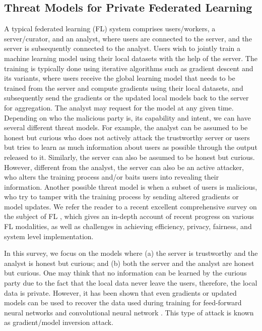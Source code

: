 
\subsection{Threat Models for Private Federated Learning}
A typical federated learning (FL) system  \cite{pmlr-v54-mcmahan17a, AdvancesFLNOW2021} comprises users/workers, a server/curator, and an analyst, where users are connected to the server, and the server is subsequently connected to the analyst. Users wish to jointly train a machine learning model using their local datasets with the help of the server. The training is typically done using iterative algorithms such as gradient descent and its variants, where users receive the global learning model that needs to be trained from the server and compute gradients using their local datasets, and subsequently send the gradients or the updated local models back to the server for aggregation. 
The analyst may request for the model at any given time. Depending on who the malicious party is, its capability and intent, we can have several different threat models. For example, the analyst can be assumed to be honest but curious who does not actively attack the trustworthy server or users but tries to learn as much information about users as possible through the output released to it. Similarly, the server can also be assumed to be honest but curious. However, different from the analyst, the server can also be an active attacker, who alters the training process and/or baits users into revealing their information. Another possible threat model is when a subset of users is malicious, who try to tamper with the training process by sending altered gradients or model updates. We refer the reader to a recent excellent comprehensive survey on the subject of FL \cite{AdvancesFLNOW2021}, which gives an in-depth account of recent progress on various FL modalities, as well as challenges in achieving efficiency, privacy, fairness, and system level implementation. 

In this survey, we focus on the models where (a) the server is trustworthy and the analyst is honest but curious; and (b) both the server and the analyst are honest but curious. One may think that no information can be learned by the curious party due to the fact that the local data never leave the users, therefore, the local data is private. However, it has been shown that even gradients or updated models can be used to recover the data used during training for feed-forward neural networks \cite{Phong2017gradientLeak, Phong2018gradientLeak, Larochelle2020Inverting} and convolutional neural network \cite{Zhu2019DeepLeak, Wang2019Beyond}. This type of attack is known as gradient/model inversion attack. 

